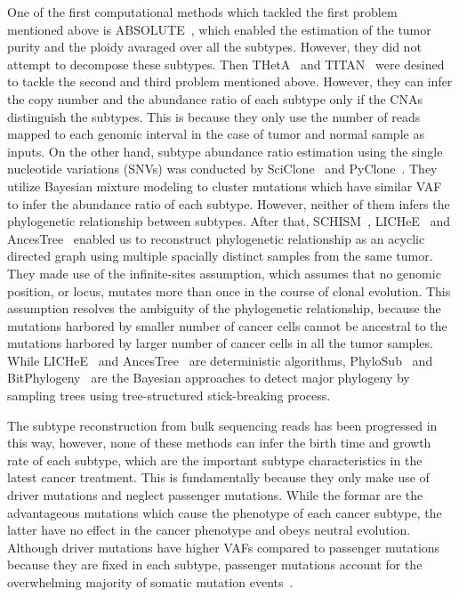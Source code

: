 \documentclass{article}
\begin{document}
One of the first computational methods which tackled the first problem mentioned above is ABSOLUTE~\cite{carter2012absolute}, which enabled the estimation of the tumor purity and the ploidy avaraged over all the subtypes.
However, they did not attempt to decompose these subtypes.
Then THetA~\cite{oesper2013inferring} and TITAN~\cite{ha2014titan} were desined to tackle the second and third problem mentioned above.
However, they can infer the copy number and the abundance ratio of each subtype only if the CNAs distinguish the subtypes.%
This is because they only use the number of reads mapped to each genomic interval in the case of tumor and normal sample as inputs.
On the other hand, subtype abundance ratio estimation using the single nucleotide variations (SNVs) was conducted by SciClone~\cite{miller2014sciclone} and PyClone~\cite{roth2014pyclone}.
They utilize Bayesian mixture modeling to cluster mutations which have similar VAF to infer the abundance ratio of each subtype.
However, neither of them infers the phylogenetic relationship between subtypes.
After that, SCHISM~\cite{niknafs2015subclonal}, LICHeE~\cite{popic2015fast} and AncesTree~\cite{el2015reconstruction} enabled us to reconstruct phylogenetic relationship as an acyclic directed graph using multiple spacially distinct samples from the same tumor.
They made use of the infinite-sites assumption, which assumes that no genomic position, or locus, mutates more than once in the course of clonal evolution.
This assumption resolves the ambiguity of the phylogenetic relationship, because the mutations harbored by smaller number of cancer cells cannot be ancestral to the mutations harbored by larger number of cancer cells in all the tumor samples.
While LICHeE~\cite{popic2015fast} and AncesTree~\cite{el2015reconstruction} are deterministic algorithms, PhyloSub~\cite{jiao2014inferring} and BitPhylogeny~\cite{yuan2015bitphylogeny} are the Bayesian approaches to detect major phylogeny by sampling trees using tree-structured stick-breaking process.

The subtype reconstruction from bulk sequencing reads has been progressed in this way, however, none of these methods can infer the birth time and growth rate of each subtype, which are the important subtype characteristics in the latest cancer treatment.
This is fundamentally because they only make use of driver mutations and neglect passenger mutations.
While the formar are the advantageous mutations which cause the phenotype of each cancer subtype, the latter have no effect in the cancer phenotype and obeys neutral evolution.
Although driver mutations have higher VAFs compared to passenger mutations because they are fixed in each subtype,
passenger mutations account for the overwhelming majority of somatic mutation events~\cite{bozic2010accumulation}.
\end{document}
